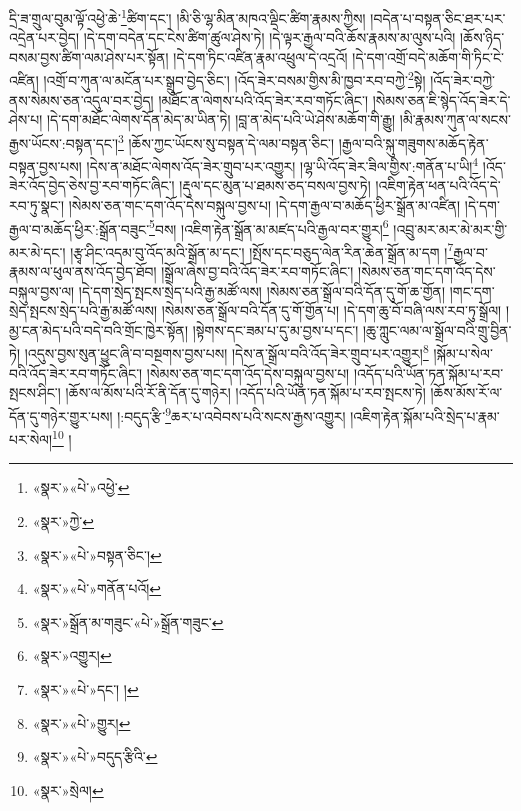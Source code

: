དྲི་ཟ་གྲུལ་བུམ་ལྟོ་འཕྱེ་ཆེ་\footnote{«སྣར་»«པེ་»འཕྱེ་}ཚིག་དང་། །མི་ཅི་ལྷ་མིན་མཁའ་ལྡིང་ཚིག་རྣམས་ཀྱིས། །བདེན་པ་བསྟན་ཅིང་ཐར་པར་འདྲེན་པར་བྱེད། །དེ་དག་བདེན་དང་ངེས་ཚིག་ཚུལ་ཤེས་ཏེ། །དེ་ལྟར་རྒྱལ་བའི་ཆོས་རྣམས་མ་ལུས་པའི། །ཆོས་ཉིད་བསམ་བྱས་ཚིག་ལམ་ཤེས་པར་སྟོན། །དེ་དག་ཏིང་འཛིན་རྣམ་འཕྲུལ་དེ་འདྲའོ། །དེ་དག་འགྲོ་བདེ་མཆོག་གི་ཏིང་ངེ་འཛིན། །འགྲོ་བ་ཀུན་ལ་མངོན་པར་སྒྲུབ་བྱེད་ཅིང་། །འོད་ཟེར་བསམ་གྱིས་མི་ཁྱབ་རབ་བཀྱེ་\footnote{«སྣར་»ཀྱེ་}སྟེ། །འོད་ཟེར་བཀྱེ་ནས་སེམས་ཅན་འདུལ་བར་བྱེད། །མཐོང་ན་ལེགས་པའི་འོད་ཟེར་རབ་གཏོང་ཞིང་། །སེམས་ཅན་ཇི་སྙེད་འོད་ཟེར་དེ་ཤེས་པ། །དེ་དག་མཐོང་ལེགས་དོན་མེད་མ་ཡིན་ཏེ། །བླ་ན་མེད་པའི་ཡེ་ཤེས་མཆོག་གི་རྒྱུ། །མི་རྣམས་ཀུན་ལ་སངས་རྒྱས་ཡོངས་:བསྟན་དང་།\footnote{«སྣར་»«པེ་»བསྟན་ཅིང་།} །ཆོས་ཀྱང་ཡོངས་སུ་བསྟན་དེ་ལམ་བསྟན་ཅིང་། །རྒྱལ་བའི་སྐུ་གཟུགས་མཆོད་རྟེན་བསྟན་བྱས་པས། །དེས་ན་མཐོང་ལེགས་འོད་ཟེར་གྲུབ་པར་འགྱུར། །ལྷ་ཡི་འོད་ཟེར་ཟིལ་གྱིས་:གནོན་པ་ཡི།\footnote{«སྣར་»«པེ་»གནོན་པའོ།} །འོད་ཟེར་འོད་བྱེད་ཅེས་བྱ་རབ་གཏོང་ཞིང་། །རྡུལ་དང་མུན་པ་ཐམས་ཅད་བསལ་བྱས་ཏེ། །འཇིག་རྟེན་ཕན་པའི་འོད་དེ་རབ་ཏུ་སྣང་། །སེམས་ཅན་གང་དག་འོད་དེས་བསྐུལ་བྱས་པ། །དེ་དག་རྒྱལ་བ་མཆོད་ཕྱིར་སྒྲོན་མ་འཛིན། །དེ་དག་རྒྱལ་བ་མཆོད་ཕྱིར་:སྒྲོན་བཟུང་\footnote{«སྣར་»སྒྲོན་མ་གཟུང་«པེ་»སྒྲོན་གཟུང་}བས། །འཇིག་རྟེན་སྒྲོན་མ་མཛད་པའི་རྒྱལ་བར་གྱུར།\footnote{«སྣར་»འགྱུར།} །འབྲུ་མར་མར་མེ་མར་གྱི་མར་མེ་དང་། །རྩྭ་ཤིང་འདམ་བུ་འོད་མའི་སྒྲོན་མ་དང་། །སྤོས་དང་བཅུད་ལེན་རིན་ཆེན་སྒྲོན་མ་དག །\footnote{«སྣར་»«པེ་»དང་། །}རྒྱལ་བ་རྣམས་ལ་ཕུལ་ནས་འོད་བྱེད་ཐོབ། །སྒྲོལ་ཞེས་བྱ་བའི་འོད་ཟེར་རབ་གཏོང་ཞིང་། །སེམས་ཅན་གང་དག་འོད་དེས་བསྐུལ་བྱས་ལ། །དེ་དག་སྲེད་སྤངས་སྲེད་པའི་རྒྱ་མཚོ་ལས། །སེམས་ཅན་སྒྲོལ་བའི་དོན་དུ་གོ་ཆ་གྱོན། །གང་དག་སྲེད་སྤངས་སྲེད་པའི་རྒྱ་མཚོ་ལས། །སེམས་ཅན་སྒྲོལ་བའི་དོན་དུ་གོ་གྱོན་པ། །དེ་དག་ཆུ་བོ་བཞི་ལས་རབ་ཏུ་སྒྲོལ། །མྱ་ངན་མེད་པའི་བདེ་བའི་གྲོང་ཁྱེར་སྟོན། །སྟེགས་དང་ཟམ་པ་དུ་མ་བྱས་པ་དང་། །ཆུ་ཀླུང་ལམ་ལ་སྒྲོལ་བའི་གྲུ་བྱིན་ཏེ། །འདུས་བྱས་སུན་ཕྱུང་ཞི་བ་བསྔགས་བྱས་པས། །དེས་ན་སྒྲོལ་བའི་འོད་ཟེར་གྲུབ་པར་འགྱུར།\footnote{«སྣར་»«པེ་»གྱུར།} །སྐོམ་པ་སེལ་བའི་འོད་ཟེར་རབ་གཏོང་ཞིང་། །སེམས་ཅན་གང་དག་འོད་དེས་བསྐུལ་བྱས་པ། །འདོད་པའི་ཡོན་ཏན་སྐོམ་པ་རབ་སྤངས་ཤིང་། །ཆོས་ལ་མོས་པའི་རོ་ནི་དོན་དུ་གཉེར། །འདོད་པའི་ཡོན་ཏན་སྐོམ་པ་རབ་སྤངས་ཏེ། །ཆོས་མོས་རོ་ལ་དོན་དུ་གཉེར་གྱུར་པས། །:བདུད་རྩི་\footnote{«སྣར་»«པེ་»བདུད་རྩིའི་}ཆར་པ་འབེབས་པའི་སངས་རྒྱས་འགྱུར། །འཇིག་རྟེན་སྐོམ་པའི་སྲེད་པ་རྣམ་པར་སེལ།\footnote{«སྣར་»སྲེལ།} །
